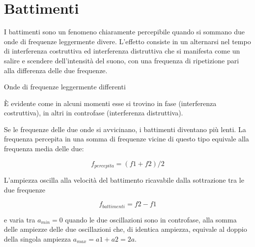 %
%
%

\clearpage

\section{Battimenti}

I battimenti sono un fenomeno chiaramente percepibile quando si sommano due onde
di frequenze leggermente divere. L'effetto consiste in
un alternarsi nel tempo di interferenza costruttiva ed interferenza distruttiva
che si manifesta come un salire e scendere dell'intensità del suono, con una
frequenza di ripetizione pari alla differenza delle due frequenze.

Onde di frequenze leggermente differenti



È evidente come in alcuni momenti esse si trovino in fase (interferenza costruttiva),
in altri in controfase (interferenza distruttiva).



Se le frequenze delle due onde si avvicinano, i battimenti diventano più lenti.
La frequenza percepita in una somma di frequenze vicine di questo tipo equivale
alla frequenza media delle due:

\[f_{percepita} = (f1 + f2) / 2\]

L'ampiezza oscilla alla velocità del battimento ricavabile dalla sottrazione tra le due frequenze

\[f_{battimenti} = f2 - f1\]

e varia tra $ a_{min} = 0 $ quando le due oscillazioni sono in controfase,
alla somma delle ampiezze delle due oscillazioni che, di identica ampiezza,
equivale al doppio della singola ampiezza $ a_{max} = a1 + a2 = 2a $.


\clearpage

